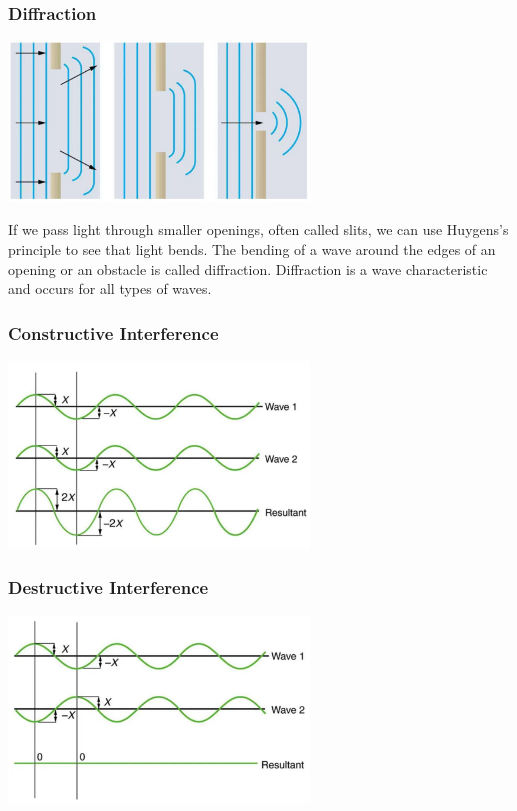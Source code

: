 \documentclass{beamer}
\begin{document}
\begin{frame}\frametitle{Diffraction}
\begin{center}
\includegraphics[width=8cm]{fig/diffraction.jpg}
\end{center}

If we pass light through smaller openings, often called slits, we can use Huygens’s principle to see that light bends. The bending of a wave around the edges of an opening or an obstacle is called diffraction. Diffraction is a wave characteristic and occurs for all types of waves.
\end{frame}

\begin{frame}\frametitle{Constructive Interference}
\begin{center}
\includegraphics[width=8cm]{fig/constructive.jpg}
\end{center}


\end{frame}


\begin{frame}\frametitle{Destructive Interference}
\begin{center}
\includegraphics[width=8cm]{fig/destructive.jpg}
\end{center}
\end{frame}
\end{document}
